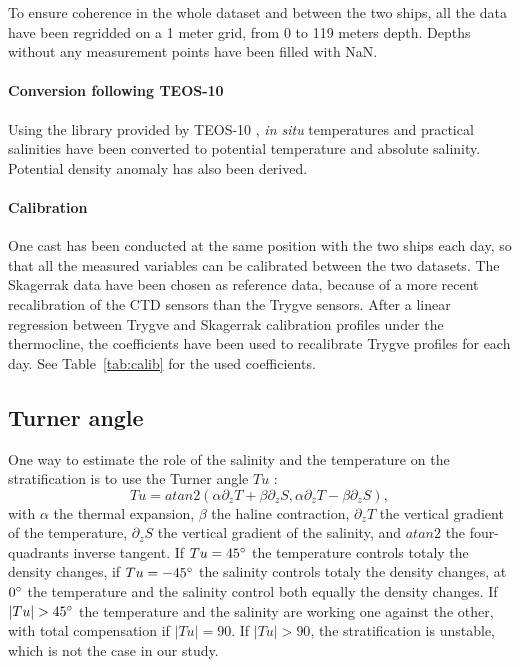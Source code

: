\documentclass[12pt,a4paper]{article}
\begin{document}
To ensure coherence in the whole dataset and between the two ships,
all the data have been regridded on a 1 meter grid, from 0 to 119 meters depth.
Depths without any measurement points have been filled with NaN.

\paragraph{Conversion following TEOS-10}
Using the library provided by TEOS-10 \citep{gsw}, {\it in situ} temperatures and practical
salinities have been converted to potential temperature and absolute salinity.
Potential density anomaly has also been derived.

\paragraph{Calibration}
One cast has been conducted at the same position with the two ships each day,
so that all the measured variables can be calibrated between the two datasets.
The Skagerrak data have been chosen as reference data, because of a more
recent recalibration of the CTD sensors than the Trygve sensors.
After a linear regression between Trygve and Skagerrak calibration profiles
under the thermocline, the coefficients have been used to recalibrate
Trygve profiles for each day.
See Table~\ref{tab:calib} for the used coefficients.


\subsection{Turner angle}
One way to estimate the role of the salinity and the temperature on the stratification
is to use the Turner angle $Tu$ \citep{ruddick1983, johnson2012}:
\[Tu = atan2(\alpha \partial_z T + \beta \partial_z S,
\alpha \partial_z T - \beta \partial_z S),\]
with $\alpha$ the thermal expansion, $\beta$ the haline contraction,
$\partial_z T$ the vertical gradient of the temperature,
$\partial_z S$ the vertical gradient of the salinity,
and $atan2$ the four-quadrants inverse tangent.
If $Tu = 45^{\circ}$ the temperature controls totaly the density changes,
if $Tu = -45^{\circ}$ the salinity controls totaly the density changes,
at $0 ^{\circ}$ the temperature and the salinity control both equally
the density changes.
If $|Tu| > 45^{\circ}$ the temperature and the salinity are working
one against the other, with total compensation if $|Tu| = 90$.
If  $|Tu| > 90$, the stratification is unstable, which is not the case in
our study.
\end{document}
